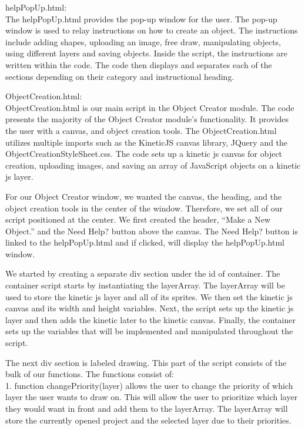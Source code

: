 \documentclass[a4paper, 11pt]{article} %
\begin{document}
helpPopUp.html:\\

The helpPopUp.html provides the pop-up window for the user. The pop-up window is used to relay instructions on how to create an object. The instructions include adding shapes, uploading an image, free draw, manipulating objects, using different layers and saving objects. Inside the script, the instructions are written within the code. The code then displays and separates each of the sections depending on their category and instructional heading.

ObjectCreation.html:\\

ObjectCreation.html is our main script in the Object Creator module. The code presents the majority of the Object Creator module’s functionality. It provides the user with a canvas, and object creation tools. The ObjectCreation.html utilizes multiple imports such as the KineticJS canvas library, JQuery and the ObjectCreationStyleSheet.css. The code sets up a kinetic js canvas for object creation, uploading images, and saving an array of JavaScript objects on a kinetic js layer.   

For our Object Creator window, we wanted the canvas, the heading, and the object creation tools in the center of the window. Therefore, we set all of our script positioned at the center. We first created the header, “Make a New Object.” and the Need Help? button above the canvas. The Need Help? button is linked to the helpPopUp.html and if clicked, will display the helpPopUp.html window.   

We started by creating a separate div section under the id of container. The container script starts by instantiating the layerArray. The layerArray will be used to store the kinetic js layer and all of its sprites. We then set the kinetic js canvas and its width and height variables. Next, the script sets up the kinetic js layer and then adds the kinetic later to the kinetic canvas. Finally, the container sets up the variables that will be implemented and manipulated throughout the script.

The next div section is labeled drawing. This part of the script consists of the bulk of our functions. The functions consist of:\\

1.	function changePriority(layer) allows the user to change the priority of which layer the user wants to draw on. This will allow the user to prioritize which layer they would want in front and add them to the layerArray. The layerArray will store the currently opened project and the selected layer due to their priorities.\\
\end{document}
